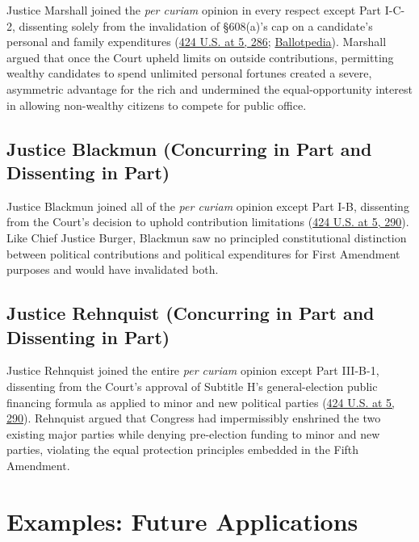 \documentclass[12pt]{article}
\begin{document}
Justice Marshall joined the \textit{per curiam} opinion in every respect except Part I-C-2, dissenting solely from the invalidation of \S 608(a)'s cap on a candidate's personal and family expenditures (\href{https://supreme.justia.com/cases/federal/us/424/1/}{424 U.S. at 5, 286}; \href{https://ballotpedia.org/Buckley_v._Valeo}{Ballotpedia}). Marshall argued that once the Court upheld limits on outside contributions, permitting wealthy candidates to spend unlimited personal fortunes created a severe, asymmetric advantage for the rich and undermined the equal-opportunity interest in allowing non-wealthy citizens to compete for public office.

\subsection{Justice Blackmun (Concurring in Part and Dissenting in Part)}

Justice Blackmun joined all of the \textit{per curiam} opinion except Part I-B, dissenting from the Court's decision to uphold contribution limitations (\href{https://supreme.justia.com/cases/federal/us/424/1/}{424 U.S. at 5, 290}). Like Chief Justice Burger, Blackmun saw no principled constitutional distinction between political contributions and political expenditures for First Amendment purposes and would have invalidated both.

\subsection{Justice Rehnquist (Concurring in Part and Dissenting in Part)}

Justice Rehnquist joined the entire \textit{per curiam} opinion except Part III-B-1, dissenting from the Court's approval of Subtitle H's general-election public financing formula as applied to minor and new political parties (\href{https://supreme.justia.com/cases/federal/us/424/1/}{424 U.S. at 5, 290}). Rehnquist argued that Congress had impermissibly enshrined the two existing major parties while denying pre-election funding to minor and new parties, violating the equal protection principles embedded in the Fifth Amendment.

\section{Examples: Future Applications}
\end{document}
